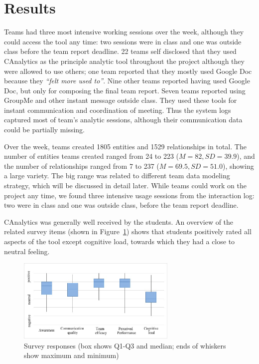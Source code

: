 \section{Results}\label{results}

Teams had three most intensive working sessions over the week, although they
could access the tool any time: two sessions were in class and one was outside
class before the team report deadline. 22 teams self disclosed that they used
CAnalytics as the principle analytic tool throughout the project although they
were allowed to use others; one team reported that they mostly used Google Doc because they \emph{``felt more used to''}. Nine other teams reported having
used Google Doc, but only for composing the final team
report.
Seven teams reported using
GroupMe and other instant message outside class. They used these tools for
instant communication and coordination of meeting. Thus the system logs captured most of team's analytic sessions, although their communication data could be partially missing.

Over the week, teams created 1805 entities and 1529 relationships in
total. The number of entities teams created ranged from 24 to 223 ($M=82,
SD=39.9$), and the number of relationships ranged from 7 to 237 ($M=69.5,
SD=51.0$), showing a large variety. The big range was related to different team data modeling strategy,
which will be discussed in detail later. While teams could work on the project any time, we found three intensive usage sessions from the interaction log: two were in class and one was outside class, before the team report deadline.

CAnalytics was generally well received by the students. An overview of
the related survey items (shown in Figure~\ref{fig:survey}) shows that students positively rated all aspects
of the tool except cognitive load, towards which they had a close to neutral feeling. %

\begin{figure}
\centering
\includegraphics[width=3.00000in]{./img/survey_boxchart.jpg}
\caption{Survey responses (box shows Q1-Q3 and median; ends of whiskers show
maximum and minimum)\label{fig:survey}}
\end{figure}

